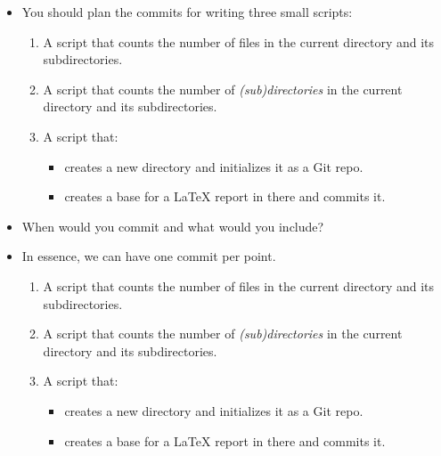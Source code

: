 \begin{frame}
  \begin{exercise}
    \begin{itemize}
      \item You should plan the commits for writing three small scripts:
        \begin{enumerate}
          \item A script that counts the number of files in the current 
            directory and its subdirectories.
          \item A script that counts the number of \emph{(sub)directories} in 
            the current directory and its subdirectories.
          \item A script that:
            \begin{itemize}
              \item creates a new directory and initializes it as a Git repo.
              \item creates a base for a LaTeX report in there and commits it.
            \end{itemize}
        \end{enumerate}
      \item When would you commit and what would you include?
    \end{itemize}
  \end{exercise}
\end{frame}

\begin{frame}
  \begin{solution}
    \begin{itemize}
      \item In essence, we can have one commit per point.
        \begin{enumerate}
          \item A script that counts the number of files in the current 
            directory and its subdirectories.
          \item A script that counts the number of \emph{(sub)directories} in 
            the current directory and its subdirectories.
          \item A script that:
            \begin{itemize}
              \item creates a new directory and initializes it as a Git 
                repo.
              \item creates a base for a LaTeX report in there and commits 
                it.
            \end{itemize}
        \end{enumerate}
    \end{itemize}
  \end{solution}
\end{frame}

